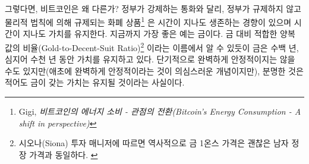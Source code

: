 
\paragraph{}
그렇다면, 비트코인은 왜 다른가? 정부가 강제하는 통화와 달리, 
정부가 규제하지 않고 물리적 법칙에 의해 규제되는 화폐 상품\footnote{Gigi, 
	\textit{비트코인의 에너지 소비 - 관점의 전환(Bitcoin's Energy Consumption - A shift in perspective)}\cite{gigi:energy}}
은 시간이 지나도 생존하는 경향이 있으며 시간이 지나도 가치를 유지한다. 지금까지 가장 좋은 예는 금이다. 
금 대비 적합한 양복 값의 비율(Gold-to-Decent-Suit Ratio)\footnote{시오나(Siona) 
	투자 매니저에 따르면 역사적으로 금 1온스 가격은 괜찮은 남자 정장 가격과 동일하다. \cite{web:gold-to-decent-suite-ratio}}
이라는 이름에서 알 수 있듯이 금은 수백 년, 심지어 수천 년 동안 가치를 유지하고 있다. 
단기적으로 완벽하게 안정적이지는 않을 수도 있지만(애초에 완벽하게 안정적이라는 것이 의심스러운 개념이지만),
분명한 것은 적어도 금이 갖는 가치는 유지될 것이라는 사실이다.



